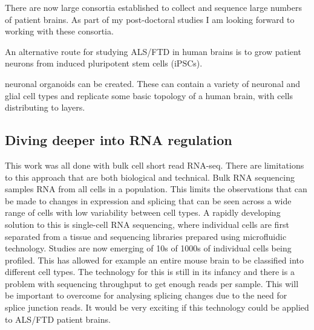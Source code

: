 There are now large consortia established to collect and sequence large numbers of patient brains. 
As part of my post-doctoral studies I am looking forward to working with these consortia.

An alternative route for studying ALS/FTD in human brains is to grow patient neurons from induced pluripotent stem cells (iPSCs).

 neuronal organoids can be created. 
These can contain a variety of neuronal and glial cell types and replicate some basic topology of a human brain, with cells distributing to layers.


\subsection{Diving deeper into RNA regulation}

This work was all done with bulk cell short read RNA-seq. 
There are limitations to this approach that are both biological and technical.
Bulk RNA sequencing samples RNA from all cells in a population. 
This limits the observations that can be made to changes in expression and splicing that can be seen across a wide range of cells with low variability between cell types.
A rapidly developing solution to this is single-cell RNA sequencing, where individual cells are first separated from a tissue and sequencing libraries prepared using microfluidic technology.
Studies are now emerging of 10s of 1000s of individual cells being profiled. 
This has allowed for example an entire mouse brain to be classified into different cell types. %
The technology for this is still in its infancy and there is a problem with sequencing throughput to get enough reads per sample.
This will be important to overcome for analysing splicing changes due to the need for splice junction reads.
It would be very exciting if this technology could be applied to ALS/FTD patient brains. 

